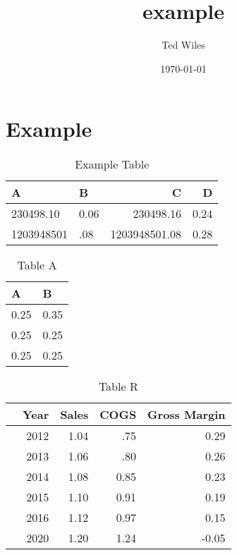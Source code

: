 \documentclass[11pt]{article}
\author{Ted Wiles}
\date{\today}
\title{example}
\begin{document}
\maketitle
\tableofcontents

\section{Example}
\label{sec-1}
\centering
\begin{table}[htb]
\caption{\label{example}Example Table}
\begin{tabular}{llrr}
A & B & C \footnotemark & D \footnotemark\\
\hline
230498.10 \footnotemark & 0.06 \footnotemark & 230498.16 & 0.24\\
1203948501 & .08 & 1203948501.08 & 0.28\\
\end{tabular}
\end{table}


\begin{table}[htb]
\caption{\label{A}Table A}
\begin{tabular}{ll}
A & B\\
\hline
0.25 \footnotemark & 0.35 \footnotemark\\
0.25 \footnotemark[5]{} & 0.25 \footnotemark[5]{}\\
0.25 \footnotemark[5]{} & 0.25 \footnotemark[5]{}\\
\end{tabular}
\end{table}


\begin{table}[htb]
\caption{\label{R}Table R}
\begin{tabular}{lrrrr}
 & Year & Sales & COGS & Gross Margin \footnotemark\\
\hline
 & 2012 & 1.04 & .75 & 0.29\\
 & 2013 & 1.06 & .80 & 0.26\\
 & 2014 & 1.08 & 0.85 & 0.23\\
 & 2015 & 1.10 & 0.91 & 0.19\\
 & 2016 & 1.12 \footnotemark & 0.97 \footnotemark[8]{} & 0.15\\
 & 2020 & 1.20 \footnotemark[8]{} & 1.24 \footnotemark[8]{} & -0.05\\
\end{tabular}
\end{table}
\end{document}
